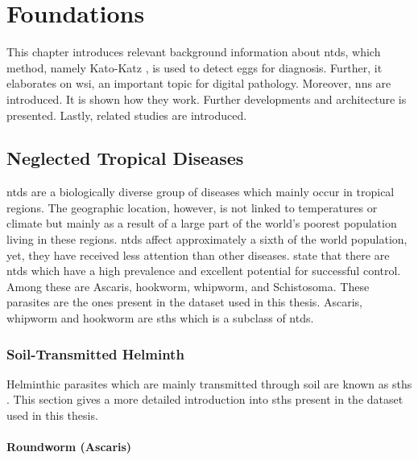 \chapter{Foundations}
\label{ch:Foundations}

This chapter introduces relevant background information about \acfp{ntd}, which method, namely Kato-Katz \cite{katz1972simple}, is used to detect eggs for diagnosis. Further, it elaborates on \acf{wsi}, an important topic for digital pathology. Moreover, \acfp{nn} are introduced. It is shown how they work. Further developments and architecture is presented. Lastly, related studies are introduced.

\section{Neglected Tropical Diseases}
\label{sec:Foundations:NTDs}

\Acp{ntd} \cite{feasey2010neglected} are a biologically diverse group of diseases which mainly occur in tropical regions. The geographic location, however, is not linked to temperatures or climate but mainly as a result of a large part of the world's poorest population living in these regions. \Acp{ntd} affect approximately a sixth of the world population, yet, they have received less attention than other diseases. \textcite{feasey2010neglected} state that there are \acp{ntd} which have a high prevalence and excellent potential for successful control. Among these are Ascaris, hookworm, whipworm, and Schistosoma. These parasites are the ones present in the dataset used in this thesis. Ascaris, whipworm and hookworm are \acp{sth} which is a subclass of \acp{ntd}.

\subsection{Soil-Transmitted Helminth} %
\label{sec:Foundations:NTDs:STHs} 

Helminthic parasites which are mainly transmitted through soil are known as \aclp{sth} \cite{feasey2010neglected,jourdan2018soiltransmitted}. This section gives a more detailed introduction into \acp{sth} present in the dataset used in this thesis.


\subsubsection{Roundworm (Ascaris)}
\label{sec:Foundations:NTDs:STHs:Ascaris}


